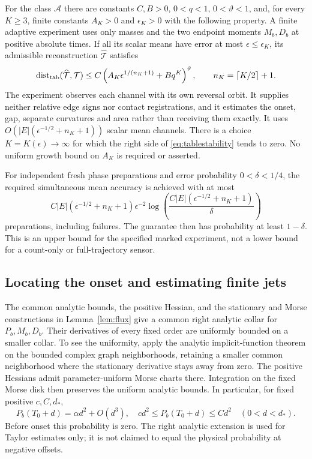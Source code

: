 \begin{theorem}
\label{thm:stable}
For the class $\mathcal A$ there are constants $C,B>0$, $0<q<1$,
$0<\vartheta<1$, and, for every $K\ge3$, finite constants
$A_K>0$ and $\epsilon_K>0$ with the following property. A finite
adaptive experiment uses only masses and the two endpoint moments
$M_b,D_b$ at positive absolute times. If all its scalar means have
error at most $\epsilon\le\epsilon_K$, its admissible reconstruction
$\widehat{\mathcal T}$ satisfies
\begin{equation}\label{eq:tablestability}
 \operatorname{dist}_{\rm tab}(\widehat{\mathcal T},\mathcal T)
 \le C\left(A_K\epsilon^{1/(n_K+1)}+Bq^K\right)^{\vartheta},
 \qquad n_K=\lceil K/2\rceil+1.
\end{equation}
The experiment observes each channel with its own reversal orbit. It
supplies neither relative edge signs nor contact registrations, and it
estimates the onset, gap, separate curvatures and area rather than
receiving them exactly. It uses
$O(|E|(\epsilon^{-1/2}+n_K+1))$ scalar mean channels.
There is a choice $K=K(\epsilon)\to\infty$ for which the right side
of \eqref{eq:tablestability} tends to zero. No uniform growth bound on
$A_K$ is required or asserted.

For independent fresh phase preparations and error probability
$0<\delta<1/4$, the required simultaneous mean accuracy is achieved
with at most
\begin{equation}\label{eq:fullsamplebudget}
 C|E|(\epsilon^{-1/2}+n_K+1)\epsilon^{-2}
 \log\!\left(\frac{C|E|(\epsilon^{-1/2}+n_K+1)}{\delta}\right)
\end{equation}
preparations, including failures. The guarantee then has probability
at least $1-\delta$. This is an upper bound for the specified marked
experiment, not a lower bound for a count-only or full-trajectory sensor.
\end{theorem}

\subsection{Locating the onset and estimating finite jets}
The common analytic bounds, the positive Hessian, and the stationary
and Morse constructions in Lemma~\ref{lem:flux} give a common right
analytic collar for $P_b,M_b,D_b$. Their derivatives of every fixed
order are uniformly bounded on a smaller collar. To see the uniformity,
apply the analytic implicit-function theorem on the bounded complex
graph neighborhoods, retaining a smaller common neighborhood where the
stationary derivative stays away from zero. The positive Hessians
admit parameter-uniform Morse charts there. Integration on the fixed
Morse disk then preserves the uniform analytic bounds. In particular,
for fixed positive $c,C,d_*$,
\begin{equation}\label{eq:onsetbounds}
 P_b(T_0+d)=\alpha d^2+O(d^3),\quad
 c d^2\le P_b(T_0+d)\le C d^2\quad(0<d<d_*).
\end{equation}
Before onset this probability is zero. The right analytic extension is
used for Taylor estimates only; it is not claimed to equal the physical
probability at negative offsets.

